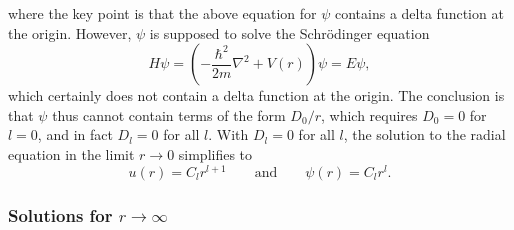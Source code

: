 \documentclass[11pt, a4paper]{article}
\renewcommand{\laplacian}{\nabla^{2}}
\newcommand{\eqtext}[1]{\qquad \text{#1} \qquad}
\newcommand{\Schro}{Schr\"{o}dinger\xspace}
\newcommand{\p}{\psi}  %
\begin{document}
\begin{itemize}
    where the key point is that the above equation for $ \psi $ contains a delta function at the origin. However, $ \psi $ is supposed to solve the \Schro equation 
    \begin{equation*}
        H \psi = \left( - \frac{\hbar^{2}}{2m}\laplacian + V(r) \right) \psi = E\psi,
    \end{equation*}
    which certainly does not contain a delta function at the origin. The conclusion is that $ \psi $ thus cannot contain terms of the form $ D_{0}/r $, which requires $ D_{0} = 0 $ for $ l = 0 $, and in fact $ D_{l} = 0 $ for all $ l $. With $ D_{l} = 0 $ for all $ l $, the solution to the radial equation in the limit $ r \to 0 $ simplifies to 
	\begin{equation*}
		u(r) = C_{l}r^{l+1} \eqtext{and} \p(r) = C_{l}r^{l}.
	\end{equation*}
	
\end{itemize}

\subsubsection{Solutions for $ r \to \infty $}
\end{document}
